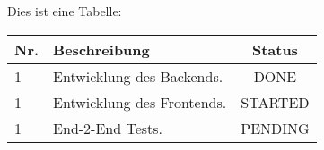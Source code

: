 \documentclass[a4paper,10pt]{article}
\begin{document}
Dies ist eine Tabelle: \\

  \begin{tabular}{|lp{10cm}|c|}
    \hline
    Nr.  & Beschreibung & Status \\ \hline
    1 & Entwicklung des Backends. & DONE \\
    1 & Entwicklung des Frontends. & STARTED \\
    1 & End-2-End Tests. & PENDING \\ \hline
  \end{tabular}
\end{document}
